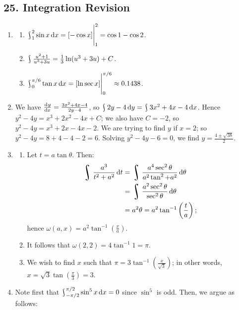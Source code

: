 \subsection*{25. Integration Revision}
\begin{enumerate}
  \item
    \begin{enumerate}
      \item $ \rint^2_1 \sin x \dif{x} = \eval{[-\cos x]}_1^2 = \cos 1 - \cos 2 $.
      \item $ \rint \frac{u^2 + 1}{u^3 + 3u} = \frac{1}{3} \ln (u^3 + 3u) + C $.
      \item $ \rint^{\pi/6}_0 \tan x \dif{x} = \eval{[\ln \sec x]}_0^{\pi/6} \approx 0.1438 $.
    \end{enumerate}
  \item We have $ \od{y}{x} = \frac{3x^2 + 4x - 4}{2y - 4} $, so $ \rint 2y - 4 \dif{y} = \rint 3x^2 + 4x - 4 \dif{x} $.
        Hence $ y^2 - 4y = x^3 + 2x^2 - 4x + C $; we also have $ C = -2 $, so $ y^2 - 4y = x^3 + 2x - 4x - 2 $. We are
        trying to find $ y $ if $ x = 2 $; so $ y^2 - 4y = 8 + 4 - 4 - 2 = 6 $. Solving $ y^2 - 4y - 6 = 0 $, we find
        $ y = \frac{4 \pm \sqrt{38}}{2} $.
  \item
    \begin{enumerate}
      \item Let $ t = a \tan \theta $. Then:
            \begin{align*}
              \rint \frac{a^3}{t^2 + a^2} \dif{t} &= \rint \frac{a^4 \sec^2 \theta}{a^2 \tan^2 + a^2} \dif{\theta}\\
                                                  &= \rint \frac{a^2 \sec^2 \theta}{\sec^2 \theta} \dif{\theta}\\
                                                  &= a^2 \theta = a^2 \tan^{-1} \left(\frac{t}{a}\right);
            \end{align*}
            hence $ \omega(a,x) = a^2 \tan^{-1} \left(\frac{x}{a}\right) $.
      \item It follows that $ \omega(2,2) = 4\tan^{-1} 1 = \pi $.
      \item We wish to find $ x $ such that $ \pi = 3 \tan^{-1} \left(\frac{x}{\sqrt{3}}\right) $;
            in other words, $ x = \sqrt{3} \tan\left(\frac{\pi}{3}\right) = 3 $.
    \end{enumerate}
  \item Note first that $ \rint^{\pi/2}_{-\pi/2} \sin^5 x \dif{x} = 0 $ since $ \sin^5 $ is odd. Then, we argue as follows:

\end{enumerate}
